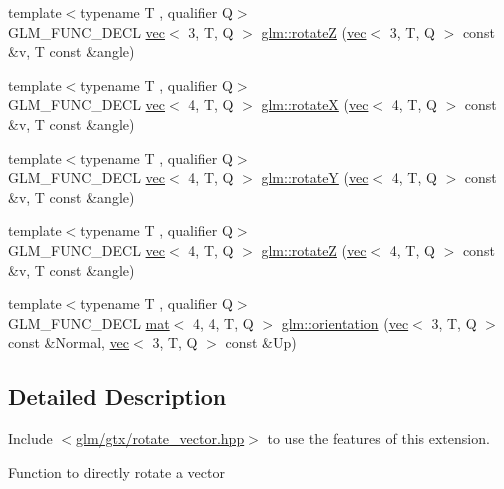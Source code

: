 \begin{DoxyCompactItemize}
\item 
{\footnotesize template$<$typename T , qualifier Q$>$ }\\G\+L\+M\+\_\+\+F\+U\+N\+C\+\_\+\+D\+E\+CL \hyperlink{structglm_1_1vec}{vec}$<$ 3, T, Q $>$ \hyperlink{group__gtx__rotate__vector_ga5a048838a03f6249acbacb4dbacf79c4}{glm\+::rotateZ} (\hyperlink{structglm_1_1vec}{vec}$<$ 3, T, Q $>$ const \&v, T const \&angle)
\item 
{\footnotesize template$<$typename T , qualifier Q$>$ }\\G\+L\+M\+\_\+\+F\+U\+N\+C\+\_\+\+D\+E\+CL \hyperlink{structglm_1_1vec}{vec}$<$ 4, T, Q $>$ \hyperlink{group__gtx__rotate__vector_ga4333b1ea8ebf1bd52bc3801a7617398a}{glm\+::rotateX} (\hyperlink{structglm_1_1vec}{vec}$<$ 4, T, Q $>$ const \&v, T const \&angle)
\item 
{\footnotesize template$<$typename T , qualifier Q$>$ }\\G\+L\+M\+\_\+\+F\+U\+N\+C\+\_\+\+D\+E\+CL \hyperlink{structglm_1_1vec}{vec}$<$ 4, T, Q $>$ \hyperlink{group__gtx__rotate__vector_ga3ce3db0867b7f8efd878ee34f95a623b}{glm\+::rotateY} (\hyperlink{structglm_1_1vec}{vec}$<$ 4, T, Q $>$ const \&v, T const \&angle)
\item 
{\footnotesize template$<$typename T , qualifier Q$>$ }\\G\+L\+M\+\_\+\+F\+U\+N\+C\+\_\+\+D\+E\+CL \hyperlink{structglm_1_1vec}{vec}$<$ 4, T, Q $>$ \hyperlink{group__gtx__rotate__vector_ga923b75c6448161053768822d880702e6}{glm\+::rotateZ} (\hyperlink{structglm_1_1vec}{vec}$<$ 4, T, Q $>$ const \&v, T const \&angle)
\item 
{\footnotesize template$<$typename T , qualifier Q$>$ }\\G\+L\+M\+\_\+\+F\+U\+N\+C\+\_\+\+D\+E\+CL \hyperlink{structglm_1_1mat}{mat}$<$ 4, 4, T, Q $>$ \hyperlink{group__gtx__rotate__vector_ga1a32fceb71962e6160e8af295c91930a}{glm\+::orientation} (\hyperlink{structglm_1_1vec}{vec}$<$ 3, T, Q $>$ const \&Normal, \hyperlink{structglm_1_1vec}{vec}$<$ 3, T, Q $>$ const \&Up)
\end{DoxyCompactItemize}


\subsection{Detailed Description}
Include $<$\hyperlink{rotate__vector_8hpp}{glm/gtx/rotate\+\_\+vector.\+hpp}$>$ to use the features of this extension.

Function to directly rotate a vector 

